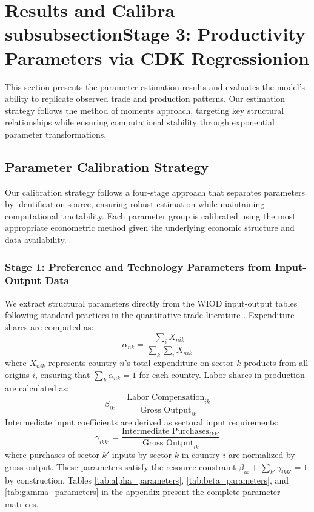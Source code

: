 \section{Results and Calibra\\subsubsection{Stage 3: Productivity Parameters via CDK Regression}ion}

This section presents the parameter estimation results and evaluates the model's ability to replicate observed trade and production patterns. Our estimation strategy follows the method of moments approach, targeting key structural relationships while ensuring computational stability through exponential parameter transformations.

\subsection{Parameter Calibration Strategy}

Our calibration strategy follows a four-stage approach that separates parameters by identification source, ensuring robust estimation while maintaining computational tractability. Each parameter group is calibrated using the most appropriate econometric method given the underlying economic structure and data availability.

\subsubsection{Stage 1: Preference and Technology Parameters from Input-Output Data}

We extract structural parameters directly from the WIOD input-output tables following standard practices in the quantitative trade literature \citep{costinot2012TheReviewofEconomicStudies}. Expenditure shares are computed as:
\begin{equation}
\alpha_{nk} = \frac{\sum_i X_{nik}}{\sum_k \sum_i X_{nik}}
\end{equation}
where $X_{nik}$ represents country $n$'s total expenditure on sector $k$ products from all origins $i$, ensuring that $\sum_k \alpha_{nk} = 1$ for each country. Labor shares in production are calculated as:
\begin{equation}
\beta_{ik} = \frac{\text{Labor Compensation}_{ik}}{\text{Gross Output}_{ik}}
\end{equation}
Intermediate input coefficients are derived as sectoral input requirements:
\begin{equation}
\gamma_{ikk'} = \frac{\text{Intermediate Purchases}_{ikk'}}{\text{Gross Output}_{ik}}
\end{equation}
where purchases of sector $k'$ inputs by sector $k$ in country $i$ are normalized by gross output. These parameters satisfy the resource constraint $\beta_{ik} + \sum_{k'} \gamma_{ikk'} = 1$ by construction. Tables \ref{tab:alpha_parameters}, \ref{tab:beta_parameters}, and \ref{tab:gamma_parameters} in the appendix present the complete parameter matrices.

